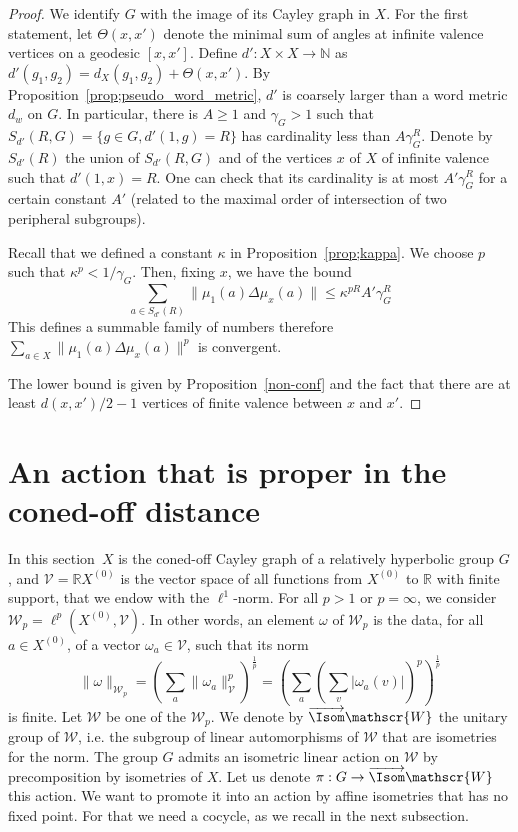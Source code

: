 \begin{proof}
We identify $G$ with the image of its Cayley graph in $X$. For the first statement, let $\Theta(x,x')$ denote the minimal sum of angles at infinite valence vertices on a geodesic $[x,x']$. Define $d': X\times X \to \mathbb{N}$ as $d'(g_1,g_2) = d_X(g_1,g_2) + \Theta(x,x')$. By Proposition~\ref{prop;pseudo_word_metric}, $d'$ is coarsely larger than a word metric $d_w$ on $G$. In particular, there is $A\geq 1$ and $ \gamma_G >1 $ such that $S_{d'}(R,G) = \{ g\in G, d'(1,g) = R\}$ has cardinality less than $A\gamma_G^R$. Denote by $S_{d'}(R)$ the union of $S_{d'}(R,G) $ and of the vertices $x$ of $X$ of infinite valence such that $d'(1,x)= R$. One can check that its cardinality is at most $A' \gamma_G^R$ for a certain constant $A'$ (related to the maximal order of intersection of two peripheral subgroups).

Recall that we defined a constant $\kappa$ in Proposition~\ref{prop;kappa}. We choose $p$ such that $\kappa^p< 1/\gamma_G$. Then, fixing $x$, we have the bound
\[
\sum_{a\in S_{d'}(R)} \| \mu_1(a) \Delta \mu_{x}(a) \| \leq
\kappa^{p R} A' \gamma_G^{ R}
\]
This defines a summable family of numbers therefore $\sum_{a\in X} \| \mu_1(a) \Delta \mu_{x}(a) \|^p $ is convergent.


The lower bound is given by Proposition~\ref{non-conf} and the fact that there are at least $d(x,x')/2 - 1$ vertices of finite valence between $x$ and $x'$.
\end{proof}


\section{An action that is proper in the coned-off distance}\label{proper_in_CO}

In this section~$X$ is the coned-off Cayley graph of a relatively hyperbolic group $G$, and $\mathscr{V}=\mathbb{R}X^{(0)}$ is the vector space of all functions from $X^{(0)}$ to $\mathbb{R}$ with finite support, that we endow with the $\ell^1$-norm. For all $p >1$ or $p=\infty$, we consider $\mathscr{W}_p= \ell^p(X^{(0)},
\mathscr{V})$. In other words, an element $\omega$ of $\mathscr{W}_p$ is the data, for all $a\in X^{(0)}$, of a vector $\omega_a\in \mathscr{V}$, such that its norm
\[
\| \omega \|_{\mathscr{W}_p} = \left(\sum_a \| \omega_a \|^p_{\mathscr{V}}
\right)^{\frac1p} = \left(\sum_a \left(\sum_v |\omega_a(v)|
\right)^p \right)^{\frac1p}
\]
is finite. Let $ {\mathscr{W}} $ be one of the ${\mathscr{W}}_p$. We denote by $\overrightarrow{{\Isom}} {\mathscr{W}}$ the unitary group of ${\mathscr{W}}$, i.e. the subgroup of linear automorphisms of ${\mathscr{W}} $ that are isometries for the norm. The group $G$ admits an isometric linear action on ${\mathscr{W}} $ by precomposition by isometries of $X$. Let us denote $\pi: G\to \overrightarrow{{\Isom}} {\mathscr{W}} $ this action. We want to promote it into an action by affine isometries that has no fixed point. For that we need a cocycle, as we recall in the next subsection.
